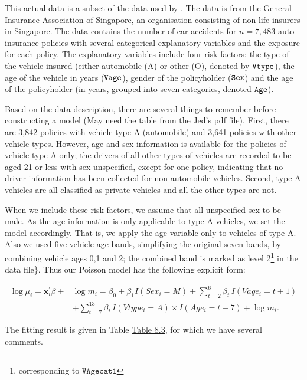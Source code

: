 \documentclass[]{book}
\let\rmarkdownfootnote\footnote%
\def\footnote{\protect\rmarkdownfootnote}
\theoremstyle{definition}
\theoremstyle{definition}
\theoremstyle{definition}
\theoremstyle{remark}
\begin{document}
This actual data is a subset of the data used by
\citep{frees2008hierarchical}. The data is from the General Insurance
Association of Singapore, an organisation consisting of non-life
insurers in Singapore. The data contains the number of car accidents for
\(n=7,483\) auto insurance policies with several categorical explanatory
variables and the exposure for each policy. The explanatory variables
include four risk factors: the type of the vehicle insured (either
automobile (A) or other (O), denoted by \(\tt{Vtype}\)), the age of the
vehicle in years (\(\tt{Vage}\)), gender of the policyholder
(\(\tt{Sex}\)) and the age of the policyholder (in years, grouped into
seven categories, denoted \(\tt{Age}\)).

Based on the data description, there are several things to remember
before constructing a model (May need the table from the Jed's pdf
file). First, there are 3,842 policies with vehicle type A (automobile)
and 3,641 policies with other vehicle types. However, age and sex
information is available for the policies of vehicle type A only; the
drivers of all other types of vehicles are recorded to be aged 21 or
less with sex unspecified, except for one policy, indicating that no
driver information has been collected for non-automobile vehicles.
Second, type A vehicles are all classified as private vehicles and all
the other types are not.

When we include these risk factors, we assume that all unspecified sex
to be male. As the age information is only applicable to type A
vehicles, we set the model accordingly. That is, we apply the age
variable only to vehicles of type A. Also we used five vehicle age
bands, simplifying the original seven bands, by combining vehicle ages
0,1 and 2; the combined band is marked as level 2\footnote{corresponding
  to \(\texttt{VAgecat1}\)} in the data file\}. Thus our Poisson model
has the following explicit form:

\begin{align*}
\log \mu_i= \mathbf{ x}^{\prime}_i\beta+&\log m_i=\beta_0+\beta_1 I(Sex_i=M)+ \sum_{t=2}^6 \beta_t\, I(Vage_i=t+1) \\
&+  \sum_{t=7}^{13} \beta_t \,I(Vtype_i=A)\times I(Age_i=t-7)+\log m_i.
\end{align*}

The fitting result is given in Table \protect\hyperlink{tab:8.3}{Table
8.3}, for which we have several comments.
\end{document}
